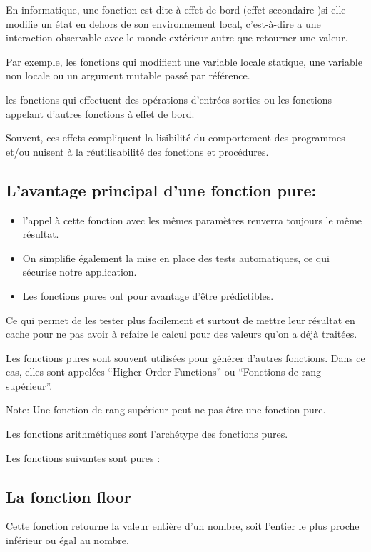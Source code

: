 \documentclass[12pt,titlepage]{article}
\begin{document}
En informatique, une fonction est dite à effet de bord (effet secondaire )si elle modifie un état en dehors de son environnement local, c'est-à-dire a une interaction observable avec le monde extérieur autre que retourner une valeur.

Par exemple, les fonctions qui modifient une variable locale statique, une variable non locale ou un argument mutable passé par référence.

les fonctions qui effectuent des opérations d'entrées-sorties ou les fonctions appelant d'autres fonctions à effet de bord.

Souvent, ces effets compliquent la lisibilité du comportement des programmes et/ou nuisent à la réutilisabilité des fonctions et procédures.

\subsection{L’avantage principal d'une fonction pure:}

\begin{itemize}
	\item l'appel à cette fonction avec les mêmes paramètres renverra toujours le même résultat.
	\item On simplifie également la mise en place des tests automatiques, ce qui sécurise notre application.
	\item Les fonctions pures ont pour avantage d’être prédictibles.
\end{itemize}

Ce qui permet de les tester plus facilement et surtout de mettre leur résultat en cache pour ne pas avoir à refaire le calcul pour des valeurs qu’on a déjà traitées.

Les fonctions pures sont souvent utilisées pour générer d’autres fonctions. Dans ce cas, elles sont appelées “Higher Order Functions” ou “Fonctions de rang supérieur”.

Note: Une fonction de rang supérieur peut ne pas être une fonction pure.


Les fonctions arithmétiques sont l'archétype des fonctions pures.

Les fonctions  suivantes sont pures :


\subsection{La fonction floor}

Cette fonction retourne la valeur entière d'un nombre, soit l'entier le plus proche inférieur ou égal au nombre.
\end{document}

